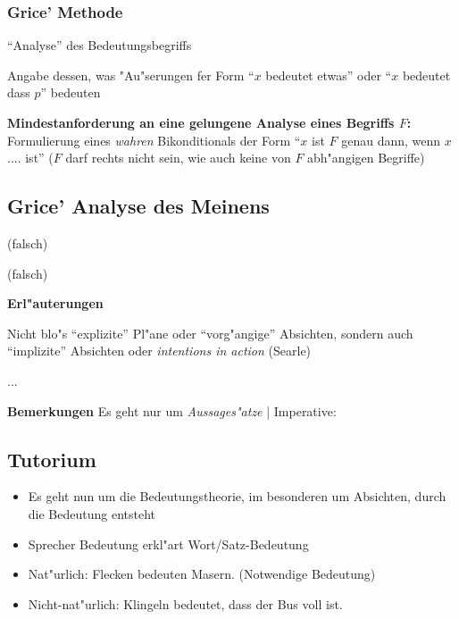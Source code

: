 \documentclass[emulatestandardclasses]{scrartcl}
\begin{document}
\subsubsection{Grice' Methode}

\begin{description}[leftmargin=!,labelwidth=\widthof{\bfseries 11}]
    \item[1] "`Analyse"' des Bedeutungsbegriffs
    \item[2] Angabe dessen, was "Au"serungen fer Form "`$x$ bedeutet etwas"' oder "`$x$ bedeutet dass $p$"' bedeuten
\end{description}

\noindent \textbf{Mindestanforderung an eine gelungene Analyse eines Begriffs $F$:}\\
Formulierung eines \emph{wahren} Bikonditionals der Form "`$x$ ist $F$ genau dann, wenn $x$ .... ist"' ($F$ darf rechts nicht sein, wie auch keine von $F$ abh"angigen Begriffe)

\subsection{Grice' Analyse des Meinens}


\begin{description}[leftmargin=!,labelwidth=\widthof{\bfseries 11}]
    \item[Analyse 1] (falsch)
    \item[Analyse 2] (falsch)
\end{description}

\noindent \textbf{Erl"auterungen}

\begin{description}[leftmargin=!,labelwidth=\widthof{\bfseries 11}]
    \item[Absicht] Nicht blo"s "`explizite"' Pl"ane oder "`vorg"angige"' Absichten, sondern auch "`implizite"' Absichten oder \emph{intentions in action} (Searle)
    \item[Erkenntnis der Absicht] ...
\end{description}

\noindent \textbf{Bemerkungen}
Es geht nur um \emph{Aussages"atze} | Imperative:


\subsection{Tutorium}

\begin{itemize}
  \item Es geht nun um die Bedeutungstheorie, im besonderen um Absichten, durch die Bedeutung entsteht
  \item Sprecher Bedeutung erkl"art Wort/Satz-Bedeutung
  \item Nat"urlich: Flecken bedeuten Masern. (Notwendige Bedeutung)
  \item Nicht-nat"urlich: Klingeln bedeutet, dass der Bus voll ist.
\end{itemize}
\end{document}
